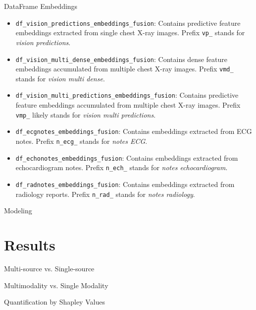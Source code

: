 \documentclass{sintefbeamer}
\theoremstyle{definition}
\begin{document}
\begin{frame}{DataFrame Embeddings}
\footnotesize

\begin{itemize}

  
  \item \texttt{df\_vision\_predictions\_embeddings\_fusion}: Contains predictive feature embeddings extracted from single chest X-ray images. Prefix \texttt{vp\_}  stands for \emph{vision predictions}.
  
  \item \texttt{df\_vision\_multi\_dense\_embeddings\_fusion}: Contains dense feature embeddings accumulated from multiple chest X-ray images. Prefix \texttt{vmd\_}  stands for \emph{vision multi dense}.
  
  \item \texttt{df\_vision\_multi\_predictions\_embeddings\_fusion}: Contains predictive feature embeddings accumulated from multiple chest X-ray images. Prefix \texttt{vmp\_} likely stands for \emph{vision multi predictions}.
  
  \item \texttt{df\_ecgnotes\_embeddings\_fusion}: Contains embeddings extracted from ECG notes. Prefix \texttt{n\_ecg\_} stands for \emph{notes ECG}.
  
  \item \texttt{df\_echonotes\_embeddings\_fusion}: Contains embeddings extracted from echocardiogram notes. Prefix \texttt{n\_ech\_}  stands for \emph{notes echocardiogram}.
  
  \item \texttt{df\_radnotes\_embeddings\_fusion}: Contains embeddings extracted from radiology reports. Prefix \texttt{n\_rad\_} stands for \emph{notes radiology}.
\end{itemize}

\end{frame}

\begin{frame}{Modeling}

\end{frame}



\section{Results}

\begin{frame}{Multi-source vs. Single-source}


\end{frame}

\begin{frame}{Multimodality vs. Single Modality}


\end{frame}

\begin{frame}{ Quantification by Shapley Values}


\end{frame}

\backmatter
\end{document}
